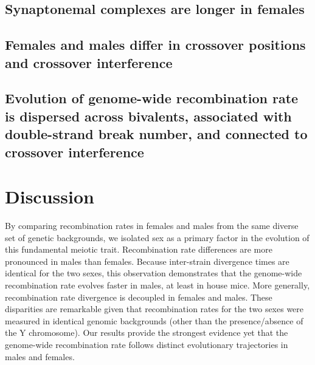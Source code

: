 \documentclass[9pt,lineno]{elife}
\begin{document}
\subsection{Synaptonemal complexes are longer in females}


\subsection{Females and males differ in crossover positions and crossover interference}


\subsection{Evolution of genome-wide recombination rate is dispersed across bivalents, associated with double-strand break number, and connected to crossover interference}


\section{Discussion}

By comparing recombination rates in females and males from the same diverse set of genetic backgrounds, we isolated sex as a primary factor in the evolution of this fundamental meiotic trait. Recombination rate differences are more pronounced in males than females. Because inter-strain divergence times are identical for the two sexes, this observation demonstrates that the genome-wide recombination rate evolves faster in males, at least in house mice. More generally, recombination rate divergence is decoupled in females and males. These disparities are remarkable given that recombination rates for the two sexes were measured in identical genomic backgrounds (other than the presence/absence of the Y chromosome). Our results provide the strongest evidence yet that the genome-wide recombination rate follows distinct evolutionary trajectories in males and females.
\end{document}
